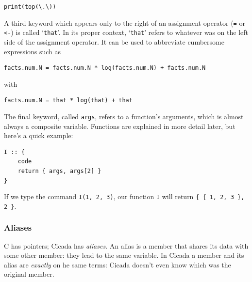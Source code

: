 \documentclass{article}
\newenvironment{code}{
       \begin{list}{}{
               \setlength{\leftmargin}{.4in}
               \setlength{\rightmargin}{0in}
               \setlength{\topsep}{.2in}
       }
       \small
       \item[] }
       { \end{list}   }
\begin{document}
\begin{code} \begin{verbatim}
print(top(\.\))
\end{verbatim} \end{code}

A third keyword which appears only to the right of an assignment operator (\verb#=# or \verb#<-#) is called `\verb#that#'.  In its proper context, `\verb#that#' refers to whatever was on the left side of the assignment operator.  It can be used to abbreviate cumbersome expressions such as

\begin{code} \begin{verbatim}
facts.num.N = facts.num.N * log(facts.num.N) + facts.num.N
\end{verbatim} \end{code}

\noindent with

\begin{code} \begin{verbatim}
facts.num.N = that * log(that) + that
\end{verbatim} \end{code}

The final keyword, called \verb#args#, refers to a function's arguments, which is almost always a composite variable.  Functions are explained in more detail later, but here's a quick example:

\begin{code} \begin{verbatim}
I :: {
    code
    return { args, args[2] }
}
\end{verbatim} \end{code}

\noindent If we type the command \verb#I(1, 2, 3)#, our function \verb#I# will return \verb#{ { 1, 2, 3 }, 2 }#.




\subsubsection{Aliases} 

C has pointers; Cicada has \emph{aliases}.  An alias is a member that shares its data with some other member:  they lead to the same variable.  In Cicada a member and its alias are \emph{exactly} on he same terms:  Cicada doesn't even know which was the original member.
\end{document}
